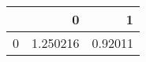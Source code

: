 \begin{tabular}{lrr}
\toprule
{} &         0 &        1 \\
\midrule
0 &  1.250216 &  0.92011 \\
\bottomrule
\end{tabular}
